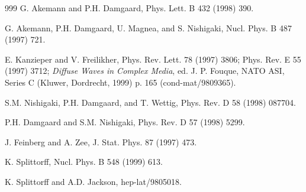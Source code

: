 \begin{thebibliography}{999}
  G. Akemann and P.H. Damgaard,
                      Phys. Lett. B 432 (1998) 390.      %

      G. Akemann, P.H. Damgaard, U. Magnea, and S. Nishigaki,
                      Nucl. Phys. B 487 (1997) 721.      %

      E. Kanzieper and V. Freilikher, 
                      Phys. Rev. Lett. 78 (1997) 3806;   %
                      Phys. Rev. E 55 (1997) 3712;       %
                      {\em Diffuse Waves in Complex Media}, ed.
                      J. P. Fouque, NATO ASI, Series C (Kluwer,
                      Dordrecht, 1999) p. 165
                      (cond-mat/9809365).                  %

      S.M. Nishigaki, P.H. Damgaard, and T. Wettig,
                      Phys. Rev. D 58 (1998) 087704.     %

     P.H. Damgaard and S.M. Nishigaki,
                      Phys. Rev. D 57 (1998) 5299.       %

     J. Feinberg and A. Zee,
                      J. Stat. Phys. 87 (1997) 473.

      K. Splittorff, 
                      Nucl. Phys. B 548 (1999) 613.      %

  K. Splittorff and A.D. Jackson,
                      hep-lat/9805018.                   %


\end{thebibliography}
